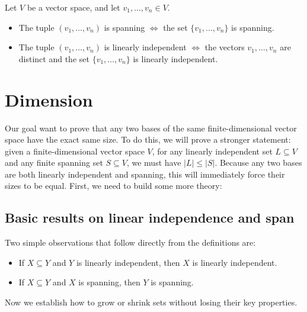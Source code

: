 \documentclass[../linear_algebra_and_groups.tex]{subfiles}
\begin{document}
\begin{proposition}
    \begin{shaded*}
        Let $V$ be a vector space, and let $v_1, \dots, v_n \in V$.
        \begin{itemize}
            \item The tuple $(v_1,\dots,v_n)$ is spanning $\iff$ the set $\{v_1,\dots,v_n\}$ is spanning.
            \item The tuple $(v_1,\dots,v_n)$ is linearly independent $\iff$ the vectors $v_1,\dots,v_n$ are distinct and the set $\{v_1,\dots,v_n\}$ is linearly independent.
        \end{itemize}
    \end{shaded*}
\end{proposition}


\section{Dimension}

Our goal want to prove that any two bases of the same finite-dimensional vector space have the exact same size. 
To do this, we will prove a stronger statement: given a finite-dimensional vector space $V$, for any linearly independent set $L\subseteq V$ and any finite spanning set $S\subseteq V$, we must have $|L| \le |S|$. Because any two bases are both linearly independent and spanning, this will immediately force their sizes to be equal.
First, we need to build some more theory:

\subsection{Basic results on linear independence and span}

Two simple observations that follow directly from the definitions are:
\begin{itemize}
    \item If $X \subseteq Y$ and $Y$ is linearly independent, then $X$ is linearly independent.
    \item If $X \subseteq Y$ and $X$ is spanning, then $Y$ is spanning.
\end{itemize}

Now we establish how to grow or shrink sets without losing their key properties.
\end{document}
